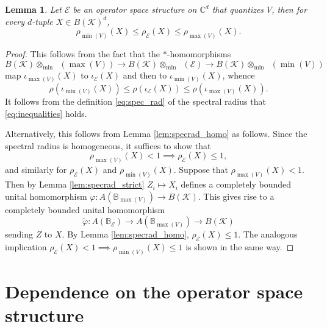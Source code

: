 \documentclass[12pt]{amsart}
\numberwithin{equation}{section}
\newtheorem{lemma}[theorem]{Lemma}
\theoremstyle{definition}
\newcommand{\cE}{\mathcal{E}}
\newcommand{\cK}{\mathcal{K}}
\newcommand{\bB}{\mathbb{B}}
\newcommand{\C}{\mathbb{C}}
\DeclareMathOperator{\cmax}{C^*_{\max}}
\begin{document}
\begin{lemma} \label{lem:specrad_ineq}
    Let $\cE$ be an operator space structure on $\C^d$ that quantizes $V$, then for every $d$-tuple $X \in B(\cK)^d$,
    \begin{equation}\label{eq:inequalities}
    \rho_{\min(V)}(X) \leq \rho_{\cE}(X) \leq \rho_{\max(V)}(X).
    \end{equation}
\end{lemma}
\begin{proof}
    This follows from the fact that the $*$-homomorphisms 
    \[
    B(\cK) \otimes_{\min} \cmax(\max(V)) \to B(\cK) \otimes_{\min} \cmax(\cE) \to B(\cK) \otimes_{\min} \cmax(\min(V))
    \]
    map $\iota_{\max(V)}(X)$ to $\iota_\cE(X)$ and then to $\iota_{\min(V)}(X)$, whence 
    \[
    \rho(\iota_{\min(V)}(X)) \leq \rho(\iota_\cE(X)) \leq \rho(\iota_{\max(V)}(X)). 
    \]
    It follows from the definition \eqref{eq:spec_rad} of the spectral radius that \eqref{eq:inequalities} holds. 

    Alternatively, this follows from Lemma \ref{lem:specrad_homo} as follows. Since the spectral radius is homogeneous, it suffices to show that 
    \[
    \rho_{\max(V)}(X) < 1 \implies \rho_{\cE}(X) \leq 1, 
    \]
    and similarly for $\rho_{\cE}(X)$ and $\rho_{\min(V)}(X)$. 
    Suppose that $\rho_{\max(V)}(X) < 1$.
    Then by Lemma \ref{lem:specrad_strict} $Z_i \mapsto X_i$ defines a completely bounded unital homomorphism $\varphi \colon A(\bB_{\max(V)}) \to B(\cK)$. 
    This gives rise to a completely bounded unital homomorphism 
    \[
    \tilde{\varphi} \colon A(\bB_\cE) \to A(\bB_{\max(V)}) \to B(\cK)
    \]
    sending $Z$ to $X$. By Lemma \ref{lem:specrad_homo}, $\rho_\cE(X) \leq 1$. 
    The analogous implication $\rho_{\cE}(X) < 1 \implies \rho_{\min(V)}(X) \leq 1$ is shown in the same way. 
\end{proof}






\section{Dependence on the operator space structure}

\end{document}
